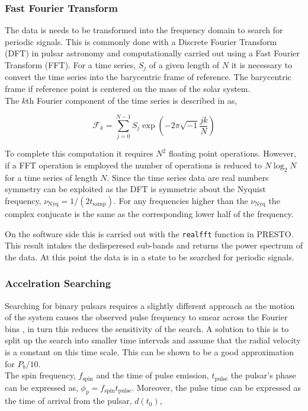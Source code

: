 \subsubsection{Fast Fourier Transform}

The data is needs to be transformed into the frequency domain to search for periodic signals. This is commonly done with a Discrete Fourier Transform (DFT) in pulsar astronomy and computationally carried out using a Fast Fourier Transform (FFT). For a time series, $S_j$ of a given length of $N$ it is necessary to convert the time series into the barycentric frame of reference. The barycentric frame if reference point is centered on the mass of the solar system. \\ The $k$th Fourier component of the time series is described in \citet[pp.~132--134]{pulsar_handbook} as,

\begin{equation}
    \mathcal{F}_k = \sum_{j=0}^{N-1} S_j \exp\left(-2\pi \sqrt{-1} \frac{jk}{N}\right)
\end{equation}

To complete this computation it requires $N^2$ floating point operations. However, if a FFT operation is employed the number of operations is reduced to $N \log_2 N$ for a time series of length $N$. Since the time series data are real numbers symmetry can be exploited as the DFT is symmetric about the Nyquist frequency, $\nu_{\text{Nyq}} = 1/(2 t_{\text{samp}})$. For any frequencies higher than the $\nu_{\text{Nyq}}$ the complex conjucate is the same as the corresponding lower half of the frequency.

On the software side this is carried out with the \texttt{realfft} function in PRESTO. This result intakes the dedisperesed sub-bands and returns the power spectrum of the data. At this point the data is in a state to be searched for periodic signals.

\subsubsection{Accelration Searching}

Searching for binary pulsars requires a slightly different approach as the motion of the system causes the observed pulse frequency to smear across the Fourier bins \citep{ng_high_2015}, in turn this reduces the sensitivity of the search. A solution to this is to split up the search into smaller time intervals and assume that the radial velocity is a constant on this time scale. This can be shown to be a good approximation for $P_b/10$. \\ 
The spin frequency, $f_{\text{spin}}$ and the time of pulse emission, $t_{\text{pulse}}$ the pulsar's phase can be expressed as, $\phi_p = f_{\text{spin}}t_{\text{pulse}}$. Moreover, the pulse time can be expressed as the time of arrival from the pulsar, $d(t_0)$, 

